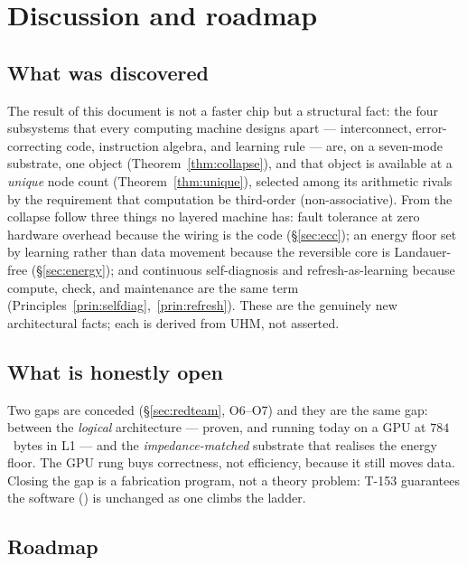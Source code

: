 \section{Discussion and roadmap}
\label{sec:discussion}

\subsection{What was discovered}

The result of this document is not a faster chip but a structural fact: the
four subsystems that every computing machine designs apart --- interconnect,
error-correcting code, instruction algebra, and learning rule --- are, on a
seven-mode substrate, one object (Theorem~\ref{thm:collapse}), and that
object is available at a \emph{unique} node count (Theorem~\ref{thm:unique}),
selected among its arithmetic rivals by the requirement that computation be
third-order (non-associative). From the collapse follow three things no
layered machine has: fault tolerance at zero hardware overhead because the
wiring is the code (\S\ref{sec:ecc}); an energy floor set by learning rather
than data movement because the reversible core is Landauer-free
(\S\ref{sec:energy}); and continuous self-diagnosis and refresh-as-learning
because compute, check, and maintenance are the same term
(Principles~\ref{prin:selfdiag},~\ref{prin:refresh}). These are the genuinely
new architectural facts; each is derived from UHM, not asserted.

\subsection{What is honestly open}

Two gaps are conceded (\S\ref{sec:redteam}, O6--O7) and they are the same
gap: between the \emph{logical} architecture --- proven, and running today on
a GPU at $784$~bytes in L1 --- and the \emph{impedance-matched} substrate
that realises the energy floor. The GPU rung buys correctness, not
efficiency, because it still moves data. Closing the gap is a fabrication
program, not a theory problem: T-153 guarantees the software (\SYNARC{}) is
unchanged as one climbs the ladder.

\subsection{Roadmap}

